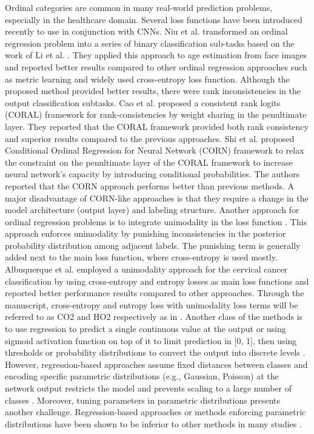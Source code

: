 \documentclass[runningheads]{llncs}
\begin{document}
Ordinal categories are common in many real-world prediction problems, especially in the healthcare domain. Several loss functions have been introduced recently to use in conjunction with CNNs. Niu et al. \cite{niu2016ordinal} transformed an ordinal regression problem into a series of binary classification sub-tasks based on the work of Li et al. \cite{NIPS2006_019f8b94}. They applied this approach to age estimation from face images and reported better results compared to other ordinal regression approaches such as metric learning and widely used cross-entropy loss function. Although the proposed method provided better results, there were rank inconsistencies in the output classification subtasks. Cao et al. \cite{cao2020rank} proposed a consistent rank logits (CORAL) framework for rank-consistencies by weight sharing in the penultimate layer. They reported that the CORAL framework provided both rank consistency and superior results compared to the previous approaches. Shi et al. \cite{shi2021deep} proposed Conditional Ordinal Regression for Neural Network (CORN) framework to relax the constraint on the penultimate layer of the CORAL framework to increase neural network's capacity by introducing conditional probabilities. The authors reported that the CORN approach performs better than previous methods. A major disadvantage of CORN-like approaches is that they require a change in the model architecture (output layer) and labeling structure. Another approach for ordinal regression problems is to integrate unimodality in the loss function \cite{belharbi2019unimoconstraints,albuquerque2021ordinal}. This approach enforces unimodality by punishing inconsistencies in the posterior probability distribution among adjacent labels. The punishing term is generally added next to the main loss function, where cross-entropy is used mostly. Albuquerque et al. \cite{albuquerque2021ordinal} employed a unimodality approach for the cervical cancer classification by using cross-entropy and entropy losses as main loss functions and reported better performance results compared to other approaches. Through the manuscript, cross-entropy and entropy loss with unimodality loss terms will be referred to as CO2 and HO2 respectively as in \cite{albuquerque2021ordinal}. Another class of the methods is to use regression to predict a single continuous value at the output or using sigmoid activation function on top of it to limit prediction in [0, 1], then using thresholds or probability distributions to convert the output into discrete levels \cite{beckham2016simple,beckham2017unimodal}. However, regression-based approaches assume fixed distances between classes and encoding specific parametric distributions (e.g., Gaussian, Poisson) at the network output restricts the model and prevents scaling to a large number of classes \cite{beckham2017unimodal}. Moreover, tuning parameters in parametric distributions presents another challenge. Regression-based approaches or methods enforcing parametric distributions have been shown to be inferior to other methods in many studies \cite{belharbi2019unimoconstraints,albuquerque2021ordinal}.
\end{document}
